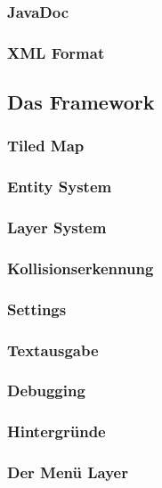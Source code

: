 		\subsubsection{JavaDoc}						
		\subsubsection{XML Format}					                 %
	\subsection{Das Framework}
		\subsubsection{Tiled Map}					
		\subsubsection{Entity System}				
		\subsubsection{Layer System}				
		\subsubsection{Kollisionserkennung}			
		\subsubsection{Settings}					
		\subsubsection{Textausgabe}					          %
		\subsubsection{Debugging}					           %
		\subsubsection{Hintergründe}				
		\subsubsection{Der Menü Layer}				
